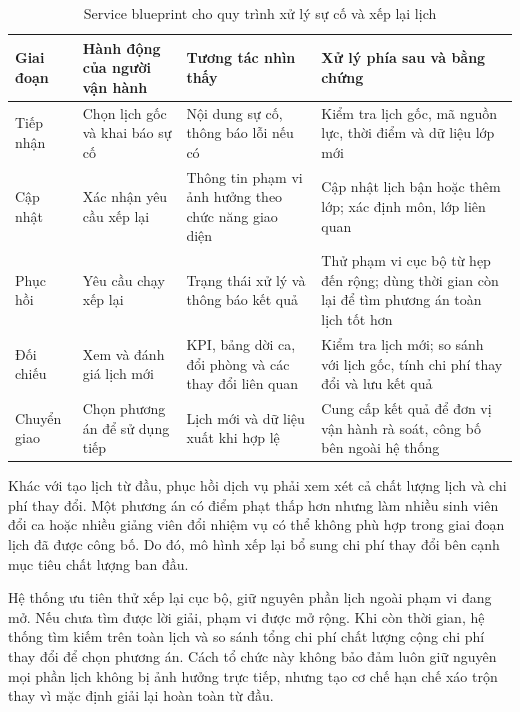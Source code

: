 \begin{table}[htbp]
    \centering
    \caption{Service blueprint cho quy trình xử lý sự cố và xếp lại lịch}
    \label{tab:blueprint-su-co}
    \scriptsize
    \begin{tabularx}{\textwidth}{@{}p{}XXX@{}}
        \toprule
        Giai đoạn & Hành động của người vận hành & Tương tác nhìn thấy & Xử lý phía sau và bằng chứng \\
        \midrule
        Tiếp nhận & Chọn lịch gốc và khai báo sự cố & Nội dung sự cố, thông báo lỗi nếu có & Kiểm tra lịch gốc, mã nguồn lực, thời điểm và dữ liệu lớp mới \\
        \addlinespace
        Cập nhật & Xác nhận yêu cầu xếp lại & Thông tin phạm vi ảnh hưởng theo chức năng giao diện & Cập nhật lịch bận hoặc thêm lớp; xác định môn, lớp liên quan \\
        \addlinespace
        Phục hồi & Yêu cầu chạy xếp lại & Trạng thái xử lý và thông báo kết quả & Thử phạm vi cục bộ từ hẹp đến rộng; dùng thời gian còn lại để tìm phương án toàn lịch tốt hơn \\
        \addlinespace
        Đối chiếu & Xem và đánh giá lịch mới & KPI, bảng dời ca, đổi phòng và các thay đổi liên quan & Kiểm tra lịch mới; so sánh với lịch gốc, tính chi phí thay đổi và lưu kết quả \\
        \addlinespace
        Chuyển giao & Chọn phương án để sử dụng tiếp & Lịch mới và dữ liệu xuất khi hợp lệ & Cung cấp kết quả để đơn vị vận hành rà soát, công bố bên ngoài hệ thống \\
        \bottomrule
    \end{tabularx}
\end{table}

Khác với tạo lịch từ đầu, phục hồi dịch vụ phải xem xét cả chất lượng lịch và chi phí thay đổi. Một phương án có điểm phạt thấp hơn nhưng làm nhiều sinh viên đổi ca hoặc nhiều giảng viên đổi nhiệm vụ có thể không phù hợp trong giai đoạn lịch đã được công bố. Do đó, mô hình xếp lại bổ sung chi phí thay đổi bên cạnh mục tiêu chất lượng ban đầu.

Hệ thống ưu tiên thử xếp lại cục bộ, giữ nguyên phần lịch ngoài phạm vi đang mở. Nếu chưa tìm được lời giải, phạm vi được mở rộng. Khi còn thời gian, hệ thống tìm kiếm trên toàn lịch và so sánh tổng chi phí chất lượng cộng chi phí thay đổi để chọn phương án. Cách tổ chức này không bảo đảm luôn giữ nguyên mọi phần lịch không bị ảnh hưởng trực tiếp, nhưng tạo cơ chế hạn chế xáo trộn thay vì mặc định giải lại hoàn toàn từ đầu.

